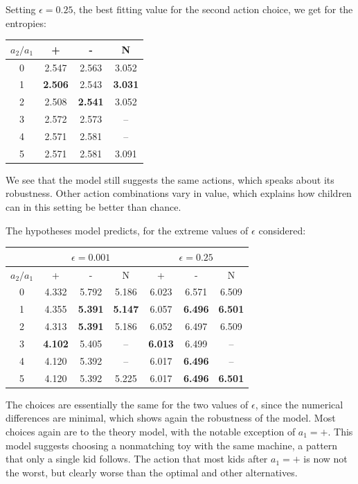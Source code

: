 \documentclass[11pt, a4paper]{article}
\begin{document}
Setting $\epsilon=0.25$, the best fitting value for the second action choice, we get for the entropies:
\begin{center}
\begin{tabular}{|c||c|c|c|}
\hline
$a_2 / a_1$ & + & - & N\\
\hline\hline
0 & 2.547 & 2.563 & 3.052 \\ 
1 & {\bf 2.506} & 2.543 & {\bf 3.031} \\ 
2 & 2.508 & {\bf 2.541} & 3.052 \\ 
3 & 2.572 & 2.573 & -- \\ 
4 & 2.571 & 2.581 & --\\ 
5 & 2.571 & 2.581 & 3.091 \\ 
\hline
\end{tabular}
\end{center}
We see that the model still suggests the same actions, which speaks about its robustness. Other action combinations vary in value, which explains how children can in this setting be better than chance. 

The hypotheses model predicts, for the extreme values of $\epsilon$ considered:
\begin{center}
\begin{tabular}{|c||c|c|c||c|c|c|}
\hline
 & \multicolumn{3}{|c||}{$\epsilon=0.001$} & \multicolumn{3}{|c|}{$\epsilon=0.25$}\\
 \hline
$a_2 / a_1$ & + & - & N  &+ & - & N\\
\hline\hline
0 & 4.332 & 5.792 & 5.186 & 6.023 & 6.571 & 6.509 \\ 
1 & 4.355 & {\bf 5.391} & {\bf 5.147} & 6.057 & {\bf 6.496} & {\bf 6.501} \\ 
2 & 4.313 & {\bf 5.391} & 5.186 & 6.052 & 6.497 & 6.509 \\ 
3 & {\bf 4.102} & 5.405 & -- & {\bf 6.013} & 6.499 & -- \\ 
4 & 4.120 & 5.392 & -- & 6.017 & {\bf 6.496} & -- \\ 
5 & 4.120 & 5.392 & 5.225 & 6.017 & {\bf 6.496} & {\bf 6.501}\\ 
\hline
\end{tabular}
\end{center}
The choices are essentially the same for the two values of $\epsilon$, since the numerical differences are minimal, which shows again the robustness of the model. Most choices again are to the theory model, with the notable exception of $a_1=+$. This model suggests choosing a nonmatching toy with the same machine, a pattern that only a single kid follows. The action that most kids after $a_1=+$ is now not the worst, but clearly worse than the optimal and other alternatives.
\end{document}
